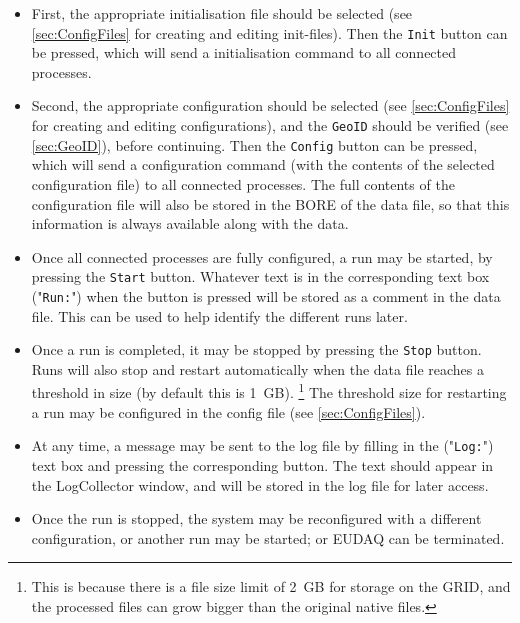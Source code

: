 \begin{itemize}
\item First, the appropriate initialisation file should be selected (see \autoref{sec:ConfigFiles} for creating and editing init-files). Then the \texttt{Init} button can be pressed,
which will send a initialisation command to all connected processes.

\item Second, the appropriate configuration should be selected 
(see \autoref{sec:ConfigFiles} for creating and editing configurations),
and the \texttt{GeoID} should be verified (see \autoref{sec:GeoID}), before continuing.
Then the \texttt{Config} button can be pressed,
which will send a configuration command
(with the contents of the selected configuration file) to all connected processes.
The full contents of the configuration file will also be stored
in the \gls{BORE} of the data file,
so that this information is always available along with the data.
\item Once all connected processes are fully configured, a run may be started, by pressing the \texttt{Start} button.
Whatever text is in the corresponding text box ("\texttt{Run:}") when the button is pressed
will be stored as a comment in the data file.
This can be used to help identify the different runs later.
\item Once a run is completed, it may be stopped by pressing the \texttt{Stop} button.
Runs will also stop and restart automatically when the data file reaches a threshold in size (by default this is 1~GB).%
\footnote{This is because there is a file size limit of 2~GB for storage on the GRID,
and the processed files can grow bigger than the original native files.}
The threshold size for restarting a run may be configured in the config file (see \autoref{sec:ConfigFiles}).
\item At any time, a message may be sent to the log file by filling in the ("\texttt{Log:}") text box and pressing the corresponding button.
The text should appear in the LogCollector window, and will be stored in the log file for later access.
\item Once the run is stopped, the system may be reconfigured with a different configuration, or another run may be started; or EUDAQ can be terminated.
  
\end{itemize}
